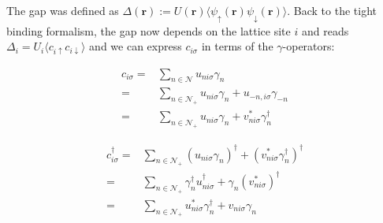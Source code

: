 \documentclass[../main.tex]{subfile}
\begin{document}
The gap was defined as $\Delta(\bm{r}) := U(\bm{r}) \langle \psi_{\uparrow}(\bm{r})\psi_{\downarrow}(\bm{r})\rangle$. Back to the tight binding formalism,
the gap now depends on the lattice site $i$ and reads
$\Delta_i = U_i\langle c_{i\uparrow}c_{i\downarrow}\rangle$ and we can express $c_{i\sigma}$ in terms of the $\gamma$-operators:\\
\begin{center}
\begin{minipage}{0.4\textwidth}
\begin{equation}
    \begin{aligned}\label{eq:BdG_transf_c}
    c_{i\sigma} =& \sum_{n\in\mathcal{N}} u_{ni\sigma}\gamma_n \\
        =& \sum_{n\in\mathcal{N}_+} u_{ni\sigma}\gamma_n + u_{-n,i\sigma}\gamma_{-n}\\
        =& \sum_{n\in\mathcal{N}_+} u_{ni\sigma}\gamma_n + v_{ni\sigma}^{\ast}\gamma_{n}^{\dagger}
    \end{aligned}
\end{equation}
\end{minipage}\hspace{0.05\textwidth}
\begin{minipage}{0.03\textwidth}
\end{minipage}
\begin{minipage}{0.45\textwidth}
    \begin{equation}
        \begin{aligned}\label{eq:BdG_transf_c_dagg}
        c_{i\sigma}^{\dagger} =& \sum_{n\in\mathcal{N}_+}( u_{ni\sigma}\gamma_n)^{\dagger} +( v_{ni\sigma}^{\ast}\gamma_{n}^{\dagger})^{\dagger} \\
            =& \sum_{n\in\mathcal{N}_+} \gamma_n^{\dagger}u_{ni\sigma}^{\dagger} + \gamma_{n}(v_{ni\sigma}^{\ast})^{\dagger} \\
            =& \sum_{n\in\mathcal{N}_+} u_{ni\sigma}^{\ast}\gamma_n^{\dagger} + v_{ni\sigma}\gamma_{n} \\
        \end{aligned}
    \end{equation}
\end{minipage}
\end{center}
\end{document}
